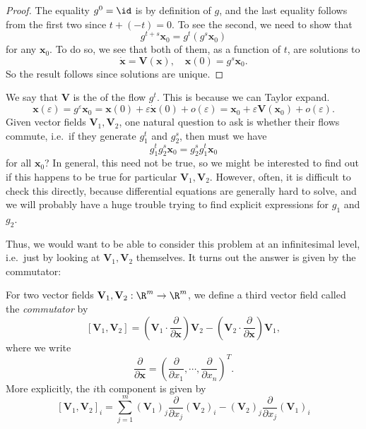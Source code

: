 \documentclass[a4paper]{article}
\begin{document}
\begin{proof}
  The equality $g^0 = \id$ is by definition of $g$, and the last equality follows from the first two since $t + (-t) = 0$. To see the second, we need to show that
  \[
    g^{t + s}\mathbf{x}_0 = g^t (g^s \mathbf{x}_0)
  \]
  for any $\mathbf{x}_0$. To do so, we see that both of them, as a function of $t$, are solutions to
  \[
    \dot{\mathbf{x}} = \mathbf{V}(\mathbf{x}),\quad \mathbf{x}(0) = g^s \mathbf{x}_0.
  \]
  So the result follows since solutions are unique.
\end{proof}

We say that $\mathbf{V}$ is the  of the flow $g^t$. This is because we can Taylor expand.
\[
  \mathbf{x}(\varepsilon) = g^\varepsilon \mathbf{x}_0 = \mathbf{x}(0) + \varepsilon \dot{\mathbf{x}}(0) + o(\varepsilon) = \mathbf{x}_0 + \varepsilon \mathbf{V}(\mathbf{x}_0) + o(\varepsilon).
\]
Given vector fields $\mathbf{V}_1, \mathbf{V}_2$, one natural question to ask is whether their flows commute, i.e.\ if they generate $g_1^t$ and $g_2^s$, then must we have
\[
  g_1^t g_2^s \mathbf{x}_0 = g_2^s g_1^t \mathbf{x}_0
\]
for all $\mathbf{x}_0$? In general, this need not be true, so we might be interested to find out if this happens to be true for particular $\mathbf{V}_1, \mathbf{V}_2$. However, often, it is difficult to check this directly, because differential equations are generally hard to solve, and we will probably have a huge trouble trying to find explicit expressions for $g_1$ and $g_2$.

Thus, we would want to be able to consider this problem at an infinitesimal level, i.e.\ just by looking at $\mathbf{V}_1, \mathbf{V}_2$ themselves. It turns out the answer is given by the commutator:
\begin{defi}[Commutator]
  For two vector fields $\mathbf{V}_1, \mathbf{V}_2: \R^m \to \R^m$, we define a third vector field called the \emph{commutator} by
  \[
    [\mathbf{V}_1, \mathbf{V}_2] = \left(\mathbf{V}_1 \cdot \frac{\partial}{\partial \mathbf{x}}\right) \mathbf{V}_2 - \left(\mathbf{V}_2 \cdot \frac{\partial}{\partial \mathbf{x}}\right) \mathbf{V}_1,
  \]
  where we write
  \[
    \frac{\partial}{\partial \mathbf{x}} = \left(\frac{\partial}{\partial x_1}, \cdots, \frac{\partial}{\partial x_n}\right)^T.
  \]
  More explicitly, the $i$th component is given by
  \[
    [\mathbf{V}_1, \mathbf{V}_2]_i = \sum_{j = 1}^m (\mathbf{V}_1)_j \frac{\partial}{\partial x_j} (\mathbf{V}_2)_i - (\mathbf{V}_2)_j \frac{\partial}{\partial x_j} (\mathbf{V}_1)_i
  \]
\end{defi}
\end{document}
